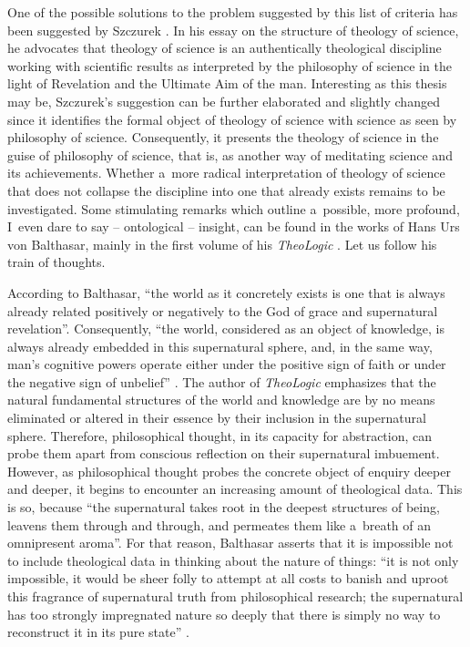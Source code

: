 One of the possible solutions to the problem suggested by this list of criteria has been suggested by Szczurek 
\parencite*[][pp.133–134]{maczka_teologia_2015-1}. %
 In his essay on the structure of theology of science, he advocates that theology of science is an authentically theological discipline working with scientific results as interpreted by the philosophy of science in the light of Revelation and the Ultimate Aim of the man. Interesting as this thesis may be, Szczurek's suggestion can be further elaborated and slightly changed since it identifies the formal object of theology of science with science as seen by philosophy of science. Consequently, it presents the theology of science in the guise of philosophy of science, that is, as another way of meditating science and its achievements. Whether a~more radical interpretation of theology of science that does not collapse the discipline into one that already exists remains to be investigated. Some stimulating remarks which outline a~possible, more profound, I~even dare to say -- ontological -- insight, can be found in the works of Hans Urs von Balthasar, mainly in the first volume of his \textit{TheoLogic} 
\parencite[][]{balthasar_theo-logic_2000}. %
 Let us follow his train of thoughts.



According to Balthasar, ``the world as it concretely exists is one that is always already related positively or negatively to the God of grace and supernatural revelation''. Consequently, ``the world, considered as an object of knowledge, is always already embedded in this supernatural sphere, and, in the same way, man's cognitive powers operate either under the positive sign of faith or under the negative sign of unbelief'' 
\parencite[][p.11]{balthasar_theo-logic_2000}. %
 The author of \textit{TheoLogic} emphasizes that the natural fundamental structures of the world and knowledge are by no means eliminated or altered in their essence by their inclusion in the supernatural sphere. Therefore, philosophical thought, in its capacity for abstraction, can probe them apart from conscious reflection on their supernatural imbuement. However, as philosophical thought probes the concrete object of enquiry deeper and deeper, it begins to encounter an increasing amount of theological data. This is so, because ``the supernatural takes root in the deepest structures of being, leavens them through and through, and permeates them like a~breath of an omnipresent aroma''. For that reason, Balthasar asserts that it is impossible not to include theological data in thinking about the nature of things: ``it is not only impossible, it would be sheer folly to attempt at all costs to banish and uproot this fragrance of supernatural truth from philosophical research; the supernatural has too strongly impregnated nature so deeply that there is simply no way to reconstruct it in its pure state'' 
\parencite[][p.12]{balthasar_theo-logic_2000}.%




